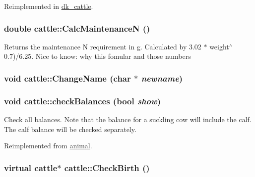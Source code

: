 Reimplemented in \hyperlink{classdk__cattle_af224d866e6cffe1530ecd307d518c4e7}{dk\_\-cattle}.\hypertarget{classcattle_a2a2b2e95eed78862af8cc6dda71c7d03}{
\subsubsection[{CalcMaintenanceN}]{\setlength{\rightskip}{0pt plus 5cm}double cattle::CalcMaintenanceN ()}}
\label{classcattle_a2a2b2e95eed78862af8cc6dda71c7d03}
Returns the maintenance N requirement in g. Calculated by 3.02 $\ast$ weight$^\wedge$0.7)/6.25. Nice to know: why this fomular and those numbers \hypertarget{classcattle_a79f811501b724b91335646e7c7452602}{
\subsubsection[{ChangeName}]{\setlength{\rightskip}{0pt plus 5cm}void cattle::ChangeName (char $\ast$ {\em newname})}}
\label{classcattle_a79f811501b724b91335646e7c7452602}
\hypertarget{classcattle_a583babf76f49e8ab7dab411195bcda2e}{
\subsubsection[{checkBalances}]{\setlength{\rightskip}{0pt plus 5cm}void cattle::checkBalances (bool {\em show})}}
\label{classcattle_a583babf76f49e8ab7dab411195bcda2e}
Check all balances. Note that the balance for a suckling cow will include the calf. The calf balance will be checked separately. 

Reimplemented from \hyperlink{classanimal_a393e6582d15379a0dd58c0d7e1faf9a7}{animal}.\hypertarget{classcattle_a0f0686111d6eb6ba5dec8b3b92cecb76}{
\subsubsection[{CheckBirth}]{\setlength{\rightskip}{0pt plus 5cm}virtual {\bf cattle}$\ast$ cattle::CheckBirth ()}}
\label{classcattle_a0f0686111d6eb6ba5dec8b3b92cecb76}


